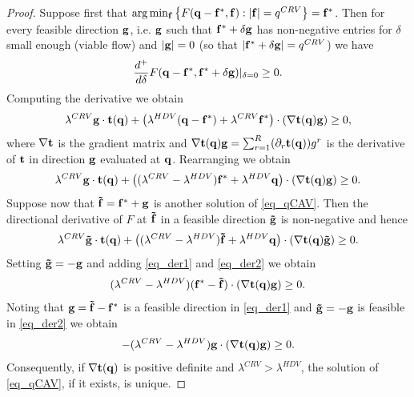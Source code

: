 \documentclass[a4paper,11pt]{article}
\begin{document}
\begin{proof}
Suppose first that $\arg \min_{\bold{f}} \left\{F(\bold{q} - \bold{f^*}, \bold{f}): |\bold{f}| = q^{CRV} \right\} = \bold{f^*}$. Then for every feasible direction  $\bold{g}$, i.e. $\bold{g}$ such that $\bold{f}^* + \delta \bold{g}$ has non-negative entries for $\delta$ small enough (viable flow) and $|\bold{g}| = 0$ (so that $|\bold{f}^* + \delta \bold{g}| = q^{CRV}$) we have
\begin{equation*}
\frac {d^+} {d\delta} F(\bold{q} - \bold{f^*}, \bold{f^*} + \delta \bold{g})|_{\delta = 0} \ge 0.
\end{equation*}
Computing the derivative we obtain 
\begin{equation*}
\lambda^{CRV} \bold{g}\cdot \bold{t(q)} + \left(\lambda^{HDV}(\bold{\bold{q} - \bold{f^*}}) + \lambda^{CRV}\bold{f^*}\right) \cdot (\nabla \bold{t}(\bold{q}) {\bold{g}})  \ge 0,
\end{equation*}
where $\bold{\nabla t}$ is the gradient matrix and $\nabla \bold{t}(\bold{q}) {\bold{g}} = \sum_{r=1}^R  (\partial_r \bold{t}(\bold{q})) g^r$ is the derivative of $\bold{t}$ in direction $\bold{g}$ evaluated at $\bold{q}$. Rearranging we obtain
\begin{equation}
\label{eq_der1}
\lambda^{CRV} \bold{g}\cdot \bold{t(q)} + \left((\lambda^{CRV}- \lambda^{HDV}) \bold{f^*} + \lambda^{HDV}\bold{q}\right) \cdot (\nabla \bold{t}(\bold{q}) {\bold{g}})  \ge 0. 
\end{equation}
Suppose now that $\bold{\tilde{f}} = \bold{f^*} + \bold{g}$ is another solution of \eqref{eq_qCAV}. Then the directional derivative of $F$ at $\bold{\tilde{f}}$ in a feasible direction $\bold{\tilde{g}}$ is non-negative and hence 
\begin{equation}
\label{eq_der2}
\lambda^{CRV} \bold{\tilde{g}}\cdot \bold{t(q)} + \left((\lambda^{CRV}- \lambda^{HDV}) \bold{\tilde{f}} + \lambda^{HDV}\bold{q}\right) \cdot (\nabla \bold{t}(\bold{q}) {\bold{\tilde{g}}})  \ge 0. 
\end{equation}
Setting $\bold{\tilde{g}} = -\bold{g}$ and adding \eqref{eq_der1} and \eqref{eq_der2} we obtain 
\begin{equation*}
(\lambda^{CRV} - \lambda^{HDV}) (\bold{f^*} - \bold{\tilde{f}})\cdot (\nabla \bold{t}(\bold{q}) {\bold{g}}) \ge 0.
\end{equation*}
Noting that $\bold{g} = \bold{\tilde{f}} - \bold{f^*}$ is a feasible direction in \eqref{eq_der1} and  $\bold{\tilde{g}} = -\bold{g}$ is feasible in \eqref{eq_der2} we obtain
\begin{equation}
\label{eq_last}
-(\lambda^{CRV} - \lambda^{HDV}) \bold{g}\cdot (\nabla \bold{t}(\bold{q}) {\bold{g}}) \ge 0.
\end{equation}
Consequently, if $\bold{\nabla t}(\bold{q})$ is positive definite and $\lambda^{CRV} > \lambda^{HDV}$, the solution of \eqref{eq_qCAV}, if it exists, is unique. 

\end{proof}
\end{document}
